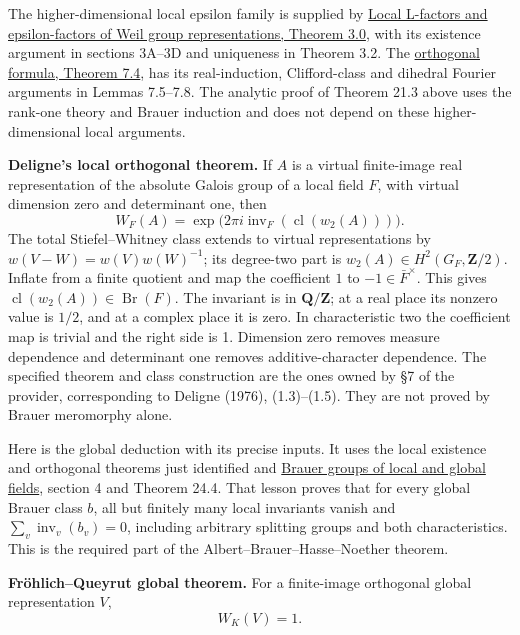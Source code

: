 \documentclass[11pt,a4paper]{article}
\begin{document}
The higher-dimensional local epsilon family is supplied by \href{https://kokunoyumeto.github.io/open-math-courses/courses/LG-GAL/local-l-factors-and-epsilon-factors.html\#3-existence-and-uniqueness-of-local-constants}{Local L-factors and epsilon-factors of Weil group representations, Theorem 3.0}, with its existence argument in sections 3A–3D and uniqueness in Theorem 3.2. The \href{https://kokunoyumeto.github.io/open-math-courses/courses/LG-GAL/local-l-factors-and-epsilon-factors.html\#7-sharp-twisting-and-orthogonal-root-numbers}{orthogonal formula, Theorem 7.4}, has its real-induction, Clifford-class and dihedral Fourier arguments in Lemmas 7.5–7.8. The analytic proof of Theorem 21.3 above uses the rank-one theory and Brauer induction and does not depend on these higher-dimensional local arguments.

\textbf{Deligne's local orthogonal theorem.} If \(A\) is a virtual
finite-image real representation of the absolute Galois group of a local
field \(F\), with virtual dimension zero and determinant one, then \[
W_F(A)=\exp\bigl(2\pi i\operatorname{inv}_F(\operatorname{cl}(w_2(A)))\bigr).
\tag{41}
\] The total Stiefel--Whitney class extends to virtual representations
by \(w(V-W)=w(V)w(W)^{-1}\); its degree-two part is
\(w_2(A)\in H^2(G_F,\mathbf Z/2)\). Inflate from a finite quotient and
map the coefficient \(1\) to \(-1\in\bar F^\times\). This gives
\(\operatorname{cl}(w_2(A))\in\operatorname{Br}(F)\). The invariant is
in \(\mathbf Q/\mathbf Z\); at a real place its nonzero value is
\(1/2\), and at a complex place it is zero. In characteristic two the
coefficient map is trivial and the right side is 1. Dimension zero
removes measure dependence and determinant one removes
additive-character dependence. The specified theorem and class
construction are the ones owned by §7 of the provider, corresponding to
Deligne (1976), (1.3)--(1.5). They are not proved by Brauer meromorphy
alone.

Here is the global deduction with its precise inputs. It uses the local
existence and orthogonal theorems just identified and
\href{../brauer-groups-of-local-and-global-fields.html}{Brauer groups of
local and global fields}, section 4 and Theorem 24.4. That lesson proves
that for every global Brauer class \(b\), all but finitely many local
invariants vanish and \(\sum_v\operatorname{inv}_v(b_v)=0\), including
arbitrary splitting groups and both characteristics. This is the
required part of the Albert--Brauer--Hasse--Noether theorem.

\textbf{Fröhlich--Queyrut global theorem.} For a finite-image orthogonal
global representation \(V\), \[
W_K(V)=1.
\tag{42}
\]
\end{document}
